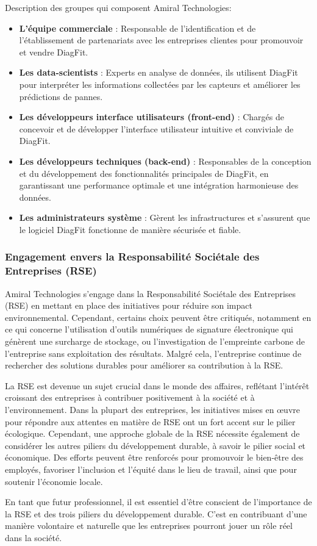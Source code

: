 Description des groupes qui composent Amiral Technologies:
\begin{itemize}
    \item \textbf{L'équipe commerciale} : Responsable de l'identification et de l'établissement de partenariats avec les entreprises clientes pour promouvoir et vendre DiagFit.
    \item \textbf{Les data-scientists} : Experts en analyse de données, ils utilisent DiagFit pour interpréter les informations collectées par les capteurs et améliorer les prédictions de pannes.
    \item \textbf{Les développeurs interface utilisateurs (front-end)} : Chargés de concevoir et de développer l'interface utilisateur intuitive et conviviale de DiagFit.
    \item \textbf{Les développeurs techniques (back-end)} : Responsables de la conception et du développement des fonctionnalités principales de DiagFit, en garantissant une performance optimale et une intégration harmonieuse des données.
    \item \textbf{Les administrateurs système} : Gèrent les infrastructures et s'assurent que le logiciel DiagFit fonctionne de manière sécurisée et fiable.
\end{itemize}


\subsubsection{Engagement envers la Responsabilité Sociétale des Entreprises (RSE)}
Amiral Technologies s'engage dans la Responsabilité Sociétale des Entreprises (RSE) en mettant en place des initiatives pour réduire son impact environnemental.
Cependant, certains choix peuvent être critiqués, notamment en ce qui concerne l'utilisation d'outils numériques de signature électronique qui génèrent une surcharge de stockage, ou l'investigation de l'empreinte carbone de l'entreprise sans exploitation des résultats.
Malgré cela, l'entreprise continue de rechercher des solutions durables pour améliorer sa contribution à la RSE.

La RSE est devenue un sujet crucial dans le monde des affaires, reflétant l'intérêt croissant des entreprises à contribuer positivement à la société et à l'environnement.
Dans la plupart des entreprises, les initiatives mises en œuvre pour répondre aux attentes en matière de RSE ont un fort accent sur le pilier écologique.
Cependant, une approche globale de la RSE nécessite également de considérer les autres piliers du développement durable, à savoir le pilier social et économique.
Des efforts peuvent être renforcés pour promouvoir le bien-être des employés, favoriser l'inclusion et l'équité dans le lieu de travail, ainsi que pour soutenir l'économie locale.

En tant que futur professionnel, il est essentiel d'être conscient de l'importance de la RSE et des trois piliers du développement durable.
C'est en contribuant d'une manière volontaire et naturelle que les entreprises pourront jouer un rôle réel dans la société.